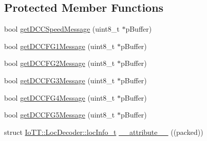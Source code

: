 \subsection*{Protected Member Functions}
\begin{DoxyCompactItemize}
\item 
bool \hyperlink{classIoTT_1_1LocDecoder_ad9cccdca1d4f151af29ac51176db61ea}{get\+D\+C\+C\+Speed\+Message} (uint8\+\_\+t $\ast$p\+Buffer)
\item 
bool \hyperlink{classIoTT_1_1LocDecoder_a9090a004fdc6d5a69d8bea29e7fd633d}{get\+D\+C\+C\+F\+G1\+Message} (uint8\+\_\+t $\ast$p\+Buffer)
\item 
bool \hyperlink{classIoTT_1_1LocDecoder_a11915d7ebd6e9f4e7b0e097f6a6b1265}{get\+D\+C\+C\+F\+G2\+Message} (uint8\+\_\+t $\ast$p\+Buffer)
\item 
bool \hyperlink{classIoTT_1_1LocDecoder_a009f4f953a84825f9d2e045f92dd046e}{get\+D\+C\+C\+F\+G3\+Message} (uint8\+\_\+t $\ast$p\+Buffer)
\item 
bool \hyperlink{classIoTT_1_1LocDecoder_a7a03b5a6889d7adbe4e6d2840b640ddc}{get\+D\+C\+C\+F\+G4\+Message} (uint8\+\_\+t $\ast$p\+Buffer)
\item 
bool \hyperlink{classIoTT_1_1LocDecoder_ae31271c6076a31717ed2b6d8717f3399}{get\+D\+C\+C\+F\+G5\+Message} (uint8\+\_\+t $\ast$p\+Buffer)
\item 
struct \hyperlink{structIoTT_1_1LocDecoder_1_1locInfo__t}{Io\+T\+T\+::\+Loc\+Decoder\+::loc\+Info\+\_\+t} \hyperlink{classIoTT_1_1LocDecoder_ac54f260ecde192daef8f083576e09881}{\+\_\+\+\_\+attribute\+\_\+\+\_\+} ((packed))
\end{DoxyCompactItemize}
